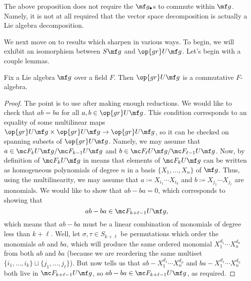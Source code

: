 \documentclass[../notes.tex]{subfiles}
\begin{document}
\begin{remark}
	The above proposition does not require the $\mf g_\bullet$s to commute within $\mf g$. Namely, it is not at all required that the vector space decomposition is actually a Lie algebra decomposition.
\end{remark}
We next move on to results which sharpen  in various ways. To begin, we will exhibit an isomorphism between $S\mf g$ and $\op{gr}U\mf g$. Let's begin with a couple lemmas.
\begin{lemma} \label{lem:gr-ug-commutative}
	Fix a Lie algebra $\mf g$ over a field $F$. Then $\op{gr}U\mf g$ is a commutative $F$-algebra.
\end{lemma}
\begin{proof}
	The point is to use  after making enough reductions. We would like to check that $ab=ba$ for all $a,b\in\op{gr}U\mf g$. This condition corresponds to an equality of some multilinear maps $\op{gr}U\mf g\times\op{gr}U\mf g\to\op{gr}U\mf g$, so it can be checked on spanning subsets of $\op{gr}U\mf g$. Namely, we may assume that $a\in\mc F_kU\mf g/\mc F_{k-1}U\mf g$ and $b\in\mc F_\ell U\mf g/\mc F_{\ell-1}U\mf g$. Now, by definition of $\mc F_kU\mf g$ in  means that elements of $\mc F_kU\mf g$ can be written as homogeneous polynomials of degree $n$ in a basis $\{X_1,\ldots,X_n\}$ of $\mf g$. Thus, using the multilinearity, we may assume that $a\coloneqq X_{i_1}\cdots X_{i_k}$ and $b\coloneqq X_{j_1}\cdots X_{j_\ell}$ are monomials. We would like to show that $ab-ba=0$, which corresponds to showing that
	\[ab-ba\in\mc F_{k+\ell-1}U\mf g,\]
	which means that $ab-ba$ must be a linear combination of monomials of degree less than $k+\ell$. Well, let $\sigma,\tau\in S_{k+\ell}$ be permutations which order the monomials $ab$ and $ba$, which will produce the same ordered monomial $X_1^{d_1}\cdots X_n^{d_n}$ from both $ab$ and $ba$ (because we are reordering the same multiset $\{i_1,\ldots,i_k\}\sqcup\{j_1,\ldots,j_\ell\}$). But now  tells us that $ab-X_1^{d_1}\cdots X_n^{d_n}$ and $ba-X_1^{d_1}\cdots X_n^{d_n}$ both live in $\mc F_{k+\ell-1}U\mf g$, so $ab-ba\in\mc F_{k+\ell-1}U\mf g$, as required.
\end{proof}
\end{document}
